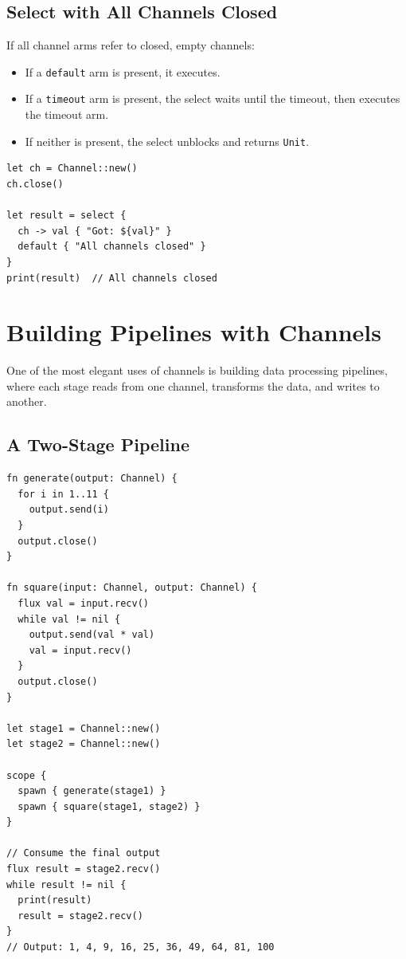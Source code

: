 \subsection{Select with All Channels Closed}

If all channel arms refer to closed, empty channels:

\begin{itemize}
  \item If a \lstinline|default| arm is present, it executes.
  \item If a \lstinline|timeout| arm is present, the select waits until the timeout, then executes the timeout arm.
  \item If neither is present, the select unblocks and returns \lstinline|Unit|.
\end{itemize}

\begin{lstlisting}[language=Lattice, caption={Select with closed channels}]
let ch = Channel::new()
ch.close()

let result = select {
  ch -> val { "Got: ${val}" }
  default { "All channels closed" }
}
print(result)  // All channels closed
\end{lstlisting}

\section{Building Pipelines with Channels}\label{sec:channel-pipelines}


One of the most elegant uses of channels is building data processing pipelines, where each stage reads from one channel, transforms the data, and writes to another.

\subsection{A Two-Stage Pipeline}

\begin{lstlisting}[language=Lattice, caption={Two-stage channel pipeline}]
fn generate(output: Channel) {
  for i in 1..11 {
    output.send(i)
  }
  output.close()
}

fn square(input: Channel, output: Channel) {
  flux val = input.recv()
  while val != nil {
    output.send(val * val)
    val = input.recv()
  }
  output.close()
}

let stage1 = Channel::new()
let stage2 = Channel::new()

scope {
  spawn { generate(stage1) }
  spawn { square(stage1, stage2) }
}

// Consume the final output
flux result = stage2.recv()
while result != nil {
  print(result)
  result = stage2.recv()
}
// Output: 1, 4, 9, 16, 25, 36, 49, 64, 81, 100
\end{lstlisting}

